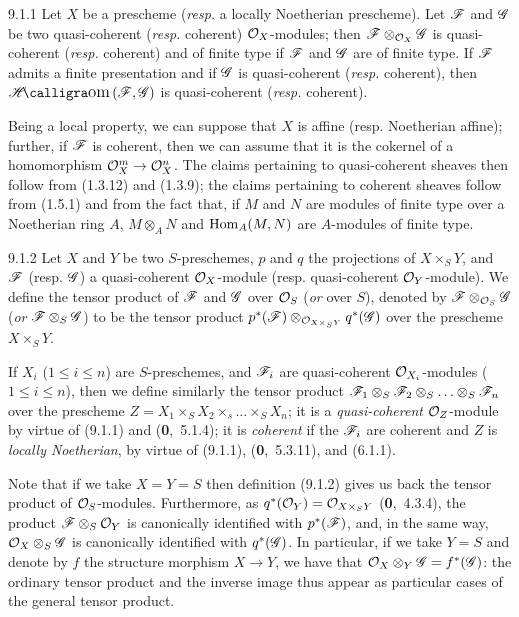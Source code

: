 \documentclass[../main.tex]{subfiles}
\begin{document}
\begin{cx}[Proposition]{9.1.1}
    Let $X$ be a prescheme (\emph{resp.} a locally Noetherian prescheme).
    Let $\mathscr{F}$ and $\mathscr{G}$ be two quasi-coherent (\emph{resp.} coherent) $\mathcal{O}_X$-modules; then $\mathscr{F}\otimes_{\mathcal{O}_X}\mathscr{G}$ is quasi-coherent (\emph{resp.} coherent) and of finite type if $\mathscr{F}$ and $\mathscr{G}$ are of finite type.
    If $\mathscr{F}$ admits a finite presentation and if $\mathscr{G}$ is quasi-coherent (\emph{resp.} coherent), then $\sheafHom(\scr{F},\scr{G})$ is quasi-coherent (\emph{resp.} coherent).
\end{cx}

Being a local property, we can suppose that $X$ is affine (resp. Noetherian affine); further, if $\mathscr{F}$ is coherent, then we can assume that it is the cokernel of a homomorphism $\mathcal{O}_X^m\to\mathcal{O}_X^n$.
The claims pertaining to quasi-coherent sheaves then follow from (1.3.12) and (1.3.9); the claims pertaining to coherent sheaves follow from (1.5.1) and from the fact that, if $M$ and $N$ are modules of finite type over a Noetherian ring $A$, $M\otimes_A N$ and $\operatorname*{Hom}_A(M,N)$ are $A$-modules of finite type.

\begin{cx}[Definition]{9.1.2}
    Let $X$ and $Y$ be two $S$-preschemes, $p$ and $q$ the projections of $X\times_S Y$, and $\mathscr{F}$ (resp. $\mathscr{G}$) a quasi-coherent $\mathcal{O}_X$-module (resp. quasi-coherent $\mathcal{O}_Y$-module).
    We define the tensor product of $\mathscr{F}$ and $\mathscr{G}$ over $\mathcal{O}_S$ (\emph{or} over $S$), denoted by $\mathscr{F}\otimes_{\mathcal{O}_S}\mathscr{G}$ (\emph{or} $\mathscr{F}\otimes_S\mathscr{G}$) to be the tensor product $p^*(\mathscr{F})\otimes_{\mathcal{O}_{X\times_S Y}}q^*(\mathscr{G})$ over the prescheme $X\times_S Y$.
\end{cx}

If $X_i$ ($1\leqslant i\leqslant n$) are $S$-preschemes, and $\mathscr{F}_i$ are quasi-coherent $\mathcal{O}_{X_i}$-modules ($1\leqslant i\leqslant n$), then we define similarly the tensor product $\mathscr{F}_1\otimes_S\mathscr{F}_2\otimes_S\ldots\otimes_S\mathscr{F}_n$ over the prescheme $Z=X_1\times_S X_2\times_s\ldots\times_S X_n$; it is a \emph{quasi-coherent} $\mathcal{O}_Z$-module by virtue of (9.1.1) and (\textbf{0},~5.1.4); it is \emph{coherent} if the $\mathscr{F}_i$ are coherent and $Z$ is \emph{locally Noetherian}, by virtue of (9.1.1), (\textbf{0},~5.3.11), and (6.1.1).

Note that if we take $X=Y=S$ then definition (9.1.2) gives us back the tensor product of $\mathcal{O}_S$-modules.
Furthermore, as $q^*(\mathcal{O}_Y)=\mathcal{O}_{X\times_S Y}$ (\textbf{0},~4.3.4), the product $\mathscr{F}\otimes_S\mathcal{O}_Y$ is canonically identified with $p^*(\mathscr{F})$, and, in the same way, $\mathcal{O}_X\otimes_S\mathscr{G}$ is canonically identified with $q^*(\mathscr{G})$.
In particular, if we take $Y=S$ and denote by $f$ the structure morphism $X\to Y$, we have that $\mathcal{O}_X\otimes_Y\mathscr{G}=f^*(\mathscr{G})$: the ordinary tensor product and the inverse image thus appear as particular cases of the general tensor product.
\end{document}
